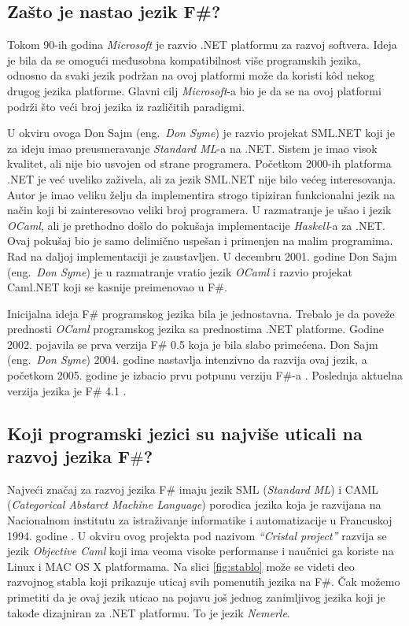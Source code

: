 \documentclass[a4paper]{article}
\begin{document}
\subsection{Zašto je nastao jezik F\#?}
\label{subsec:nastanak}

Tokom 90-ih godina {\em Microsoft} je razvio .NET \cite{microsoft_.net,early_history} platformu za razvoj softvera. Ideja je bila da se omogući međusobna kompatibilnost više programskih jezika, odnosno da svaki jezik podržan na ovoj platformi može da koristi kôd nekog drugog jezika platforme. Glavni cilj {\em Microsoft}-a bio je da se na ovoj platformi podrži što veći broj jezika iz različitih paradigmi. 

U okviru ovoga Don Sajm (eng.~{\em Don Syme}) je razvio projekat SML.NET koji je za ideju imao preusmeravanje {\em Standard ML}-a na .NET. Sistem je imao visok kvalitet, ali nije bio usvojen od strane programera. Početkom 2000-ih platforma .NET je već uveliko zaživela, ali za jezik SML.NET nije bilo većeg interesovanja. Autor je imao veliku želju da implementira strogo tipiziran funkcionalni jezik na način koji bi zainteresovao veliki broj programera. U razmatranje je ušao i jezik {\em OCaml}, ali je prethodno došlo do pokušaja implementacije {\em Haskell}-a za .NET. Ovaj pokušaj bio je samo delimično uspešan i primenjen na malim programima. Rad na daljoj implementaciji je zaustavljen. U decembru 2001. godine Don Sajm (eng.~{\em Don Syme}) je u razmatranje vratio jezik {\em OCaml} i razvio projekat Caml.NET koji se kasnije preimenovao u F\#.

Inicijalna ideja F\# programskog jezika bila je jednostavna. Trebalo je da poveže prednosti {\em OCaml} programskog jezika sa prednostima .NET platforme. Godine 2002. pojavila se prva verzija F\# 0.5 koja je bila slabo primećena. Don Sajm (eng.~{\em Don Syme}) 2004. godine nastavlja intenzivno da razvija ovaj jezik, a početkom 2005. godine je izbacio prvu potpunu verziju F\#-a \cite{early_history}. Poslednja aktuelna verzija jezika je F\# 4.1 \cite{fsharp}.

\subsection{Koji programski jezici su najviše uticali na razvoj jezika F$\#$?}
\label{subsec:uticaj}

Najveći značaj za razvoj jezika F\# imaju jezik SML ({\em Standard ML}) i CAML ({\em Categorical Abstarct Machine Language}) porodica jezika koja je razvijana na Nacionalnom institutu za istraživanje informatike i automatizacije u Francuskoj 1994. godine \cite{Harrop:2008:FS:1481410}. U okviru ovog projekta pod nazivom {\em “Cristal project”} razvija se jezik {\em Objective Caml} koji ima veoma visoke performanse i naučnici ga koriste na Linux i MAC OS X platformama. Na slici \ref{fig:stablo} može se videti deo razvojnog stabla koji prikazuje uticaj svih pomenutih jezika na F\#. Čak možemo primetiti da je ovaj jezik uticao na pojavu još jednog zanimljivog jezika koji je takođe dizajniran za .NET platformu. To je jezik {\em Nemerle}.
\end{document}
